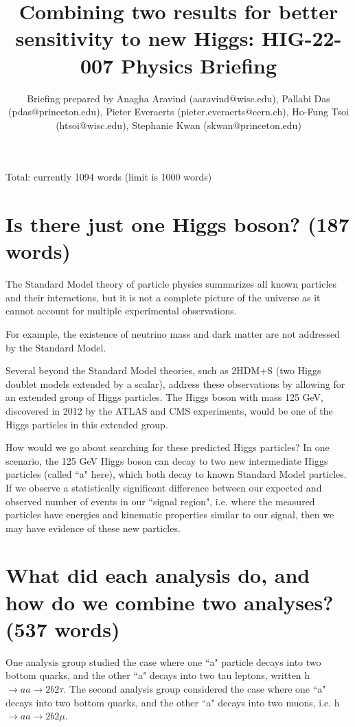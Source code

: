 \documentclass{article}
\title{Combining two results for better sensitivity to new Higgs: HIG-22-007 Physics Briefing}
\author{Briefing prepared by Anagha Aravind (aaravind@wisc.edu), Pallabi Das (pdas@princeton.edu), Pieter Everaerts (pieter.everaerts@cern.ch), Ho-Fung Tsoi (htsoi@wisc.edu), Stephanie Kwan (skwan@princeton.edu)}
\begin{document}
\maketitle

Total: currently 1094 words (limit is 1000 words)

\section{Is there just one Higgs boson? (187 words)}

The Standard Model theory of particle physics summarizes all known particles and their interactions, but it is not a complete picture of the universe as it cannot account for multiple experimental observations. 

For example, the existence of neutrino mass and dark matter are not addressed by the Standard Model. 

Several beyond the Standard Model theories, such as 2HDM+S (two Higgs doublet models extended by a scalar), address these observations by allowing for an extended group of Higgs particles. The Higgs boson with mass 125 GeV, 
discovered in 2012 by the ATLAS and CMS experiments, would be one of the Higgs particles in this extended group. 

How would we go about searching for these predicted Higgs particles? In one scenario, the 125 GeV Higgs boson can decay to two new intermediate Higgs particles (called ``a" here),
which both decay to known Standard Model particles. If we observe a statistically significant difference between our expected and observed number of events in our ``signal region", i.e. where the measured particles have 
energies and kinematic properties similar to our signal, then we may have evidence of these new particles. 


\section{What did each analysis do, and how do we combine two analyses? (537 words)}

One analysis group studied the case where one ``a" particle decays into two bottom quarks, and the other ``a" decays into two tau leptons, written h $\rightarrow aa \rightarrow 2b2\tau$.
The second analysis group considered the case where one ``a" decays into two bottom quarks, and the other ``a" decays into two muons, i.e. h $\rightarrow aa \rightarrow 2b2\mu$. 
\end{document}
